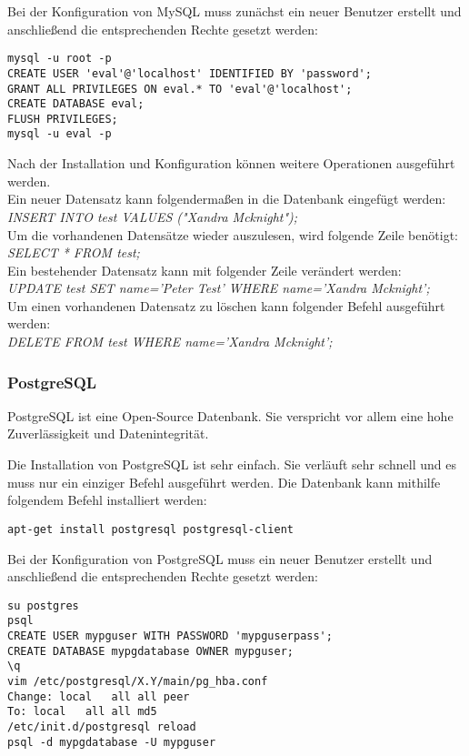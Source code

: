 Bei der Konfiguration von MySQL muss zunächst ein neuer Benutzer erstellt und anschließend die entsprechenden Rechte gesetzt werden:
\begin{lstlisting}[caption=Konfiguration von MySQL \cite{ADDUSERMYSQL}]
mysql -u root -p
CREATE USER 'eval'@'localhost' IDENTIFIED BY 'password';
GRANT ALL PRIVILEGES ON eval.* TO 'eval'@'localhost';
CREATE DATABASE eval;
FLUSH PRIVILEGES;
mysql -u eval -p
\end{lstlisting}

Nach der Installation und Konfiguration können weitere Operationen ausgeführt werden.\\
Ein neuer Datensatz kann folgendermaßen in die Datenbank eingefügt werden:\\
\textit{INSERT INTO test VALUES ("Xandra Mcknight");}\\
Um die vorhandenen Datensätze wieder auszulesen, wird folgende Zeile benötigt:\\
\textit{SELECT * FROM test;}\\
Ein bestehender Datensatz kann mit folgender Zeile verändert werden:\\
\textit{UPDATE test SET name='Peter Test' WHERE name='Xandra Mcknight';}\\
Um einen vorhandenen Datensatz zu löschen kann folgender Befehl ausgeführt werden:\\
\textit{DELETE FROM test WHERE name='Xandra Mcknight';}

\subsubsection{PostgreSQL}
PostgreSQL ist eine Open-Source Datenbank. Sie verspricht vor allem eine hohe Zuverlässigkeit und Datenintegrität.\cite{ABOUTPOSTGRES}

Die Installation von PostgreSQL ist sehr einfach. Sie verläuft sehr schnell und es muss nur ein einziger Befehl ausgeführt werden. Die Datenbank kann mithilfe folgendem Befehl installiert werden:
\begin{lstlisting}[caption=Installation von PostgreSQL \cite{POSTGRES}]
apt-get install postgresql postgresql-client
\end{lstlisting}

Bei der Konfiguration von PostgreSQL muss ein neuer Benutzer erstellt und anschließend die entsprechenden Rechte gesetzt werden:
\begin{lstlisting}[caption=Konfiguration von PostgreSQL \cite{POSTGRES}]
su postgres
psql
CREATE USER mypguser WITH PASSWORD 'mypguserpass';
CREATE DATABASE mypgdatabase OWNER mypguser;
\q
vim /etc/postgresql/X.Y/main/pg_hba.conf
Change: local	all	all	peer
To: local	all	all	md5
/etc/init.d/postgresql reload
psql -d mypgdatabase -U mypguser
\end{lstlisting}

